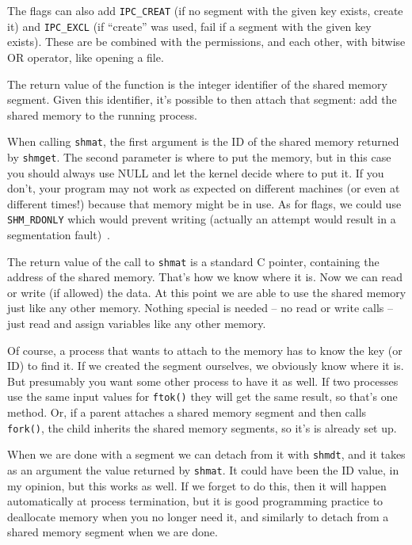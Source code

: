 The flags can also add \texttt{IPC\_CREAT} (if no segment with the given key exists, create it) and \texttt{IPC\_EXCL} (if ``create'' was used, fail if a segment with the given key exists). These are be combined with the permissions, and each other, with bitwise OR operator, like opening a file.

The return value of the function is the integer identifier of the shared memory segment. Given this identifier, it's possible to then attach that segment: add the shared memory to the running process.

When calling \texttt{shmat}, the first argument is the ID of the shared memory returned by \texttt{shmget}. The second parameter is where to put the memory, but in this case you should always use NULL and let the kernel decide where to put it. If you don't, your program may not work as expected on different machines (or even at different times!) because that memory might be in use. As for flags, we could use \texttt{SHM\_RDONLY} which would prevent writing (actually an attempt would result in a segmentation fault)~\cite{lpi}.

The return value of the call to \texttt{shmat} is a standard C pointer, containing the address of the shared memory. That's how we know where it is. Now we can read or write (if allowed) the data. At this point we are able to use the shared memory just like any other memory. Nothing special is needed -- no read or write calls -- just read and assign variables like any other memory.

Of course, a process that wants to attach to the memory has to know the key (or ID) to find it. If we created the segment ourselves, we obviously know where it is. But presumably you want some other process to have it as well. If two processes use the same input values for \texttt{ftok()} they will get the same result, so that's one method. Or, if a parent attaches a shared memory segment and then calls \texttt{fork()}, the child inherits the shared memory segments, so it's is already set up.

When we are done with a segment we can detach from it with \texttt{shmdt}, and it takes as an argument the value returned by \texttt{shmat}. It could have been the ID value, in my opinion, but this works as well. If we forget to do this, then it will happen automatically at process termination, but it is good programming practice to deallocate memory when you no longer need it, and similarly to detach from a shared memory segment when we are done.

